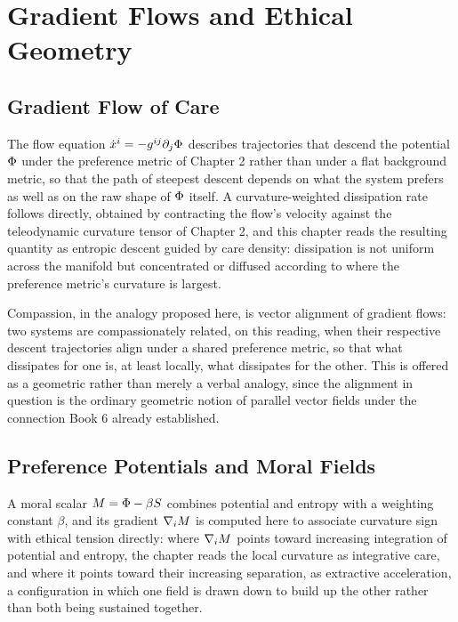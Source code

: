\part{Gradient Flows and Ethical Geometry}

\chapter{Gradient Flow of Care}

The flow equation $\dot{x}^i = -g^{ij} \partial_j \Phi$ describes trajectories that descend the potential $\Phi$ under the preference metric of Chapter 2 rather than under a flat background metric, so that the path of steepest descent depends on what the system prefers as well as on the raw shape of $\Phi$ itself. A curvature-weighted dissipation rate follows directly, obtained by contracting the flow's velocity against the teleodynamic curvature tensor of Chapter 2, and this chapter reads the resulting quantity as entropic descent guided by care density: dissipation is not uniform across the manifold but concentrated or diffused according to where the preference metric's curvature is largest.

Compassion, in the analogy proposed here, is vector alignment of gradient flows: two systems are compassionately related, on this reading, when their respective descent trajectories align under a shared preference metric, so that what dissipates for one is, at least locally, what dissipates for the other. This is offered as a geometric rather than merely a verbal analogy, since the alignment in question is the ordinary geometric notion of parallel vector fields under the connection Book 6 already established.

\chapter{Preference Potentials and Moral Fields}

A moral scalar $M = \Phi - \beta S$ combines potential and entropy with a weighting constant $\beta$, and its gradient $\nabla_i M$ is computed here to associate curvature sign with ethical tension directly: where $\nabla_i M$ points toward increasing integration of potential and entropy, the chapter reads the local curvature as integrative care, and where it points toward their increasing separation, as extractive acceleration, a configuration in which one field is drawn down to build up the other rather than both being sustained together.

